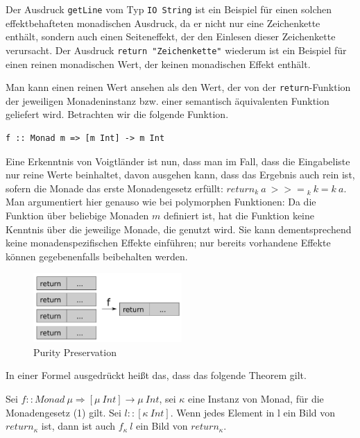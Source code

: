 Der Ausdruck \texttt{getLine} vom Typ \texttt{IO String} ist ein Beispiel für einen solchen effektbehafteten monadischen Ausdruck, da
er nicht nur eine Zeichenkette enthält, sondern auch einen Seiteneffekt, der den Einlesen dieser Zeichenkette verursacht.
Der Ausdruck \texttt{return\ "Zeichenkette"} wiederum ist ein Beispiel für einen reinen monadischen Wert, der keinen monadischen
Effekt enthält.

Man kann einen reinen Wert ansehen als den Wert, der von der \texttt{return}-Funktion der jeweiligen Monadeninstanz
bzw. einer semantisch äquivalenten Funktion geliefert wird. Betrachten wir die folgende Funktion.

\begin{verbatim}
f :: Monad m => [m Int] -> m Int
\end{verbatim}

Eine Erkenntnis von Voigtländer ist nun, dass man im Fall, dass die Eingabeliste nur reine Werte beinhaltet, davon ausgehen
kann, dass das Ergebnis auch rein ist, sofern die Monade das erste Monadengesetz erfüllt: $return_k\ a\ {>>=}_k\ k = k\ a$. Man argumentiert hier genauso wie bei polymorphen Funktionen: Da die Funktion über
beliebige Monaden $m$ definiert ist, hat die Funktion keine Kenntnis über die jeweilige Monade, die genutzt wird.
Sie kann dementsprechend keine monadenspezifischen Effekte einführen; nur bereits vorhandene
Effekte können gegebenenfalls beibehalten werden.

\begin{figure}[ht]
\centering
\includegraphics[height=100px]{purity-preservation}
\caption{Purity Preservation}
\label{fig:purity-preservation}
\end{figure}

In einer Formel ausgedrückt heißt das, dass das folgende Theorem gilt.

\begin{mytheorem}
Sei $f :: Monad\ \mu \Rightarrow [\mu\ Int] \rightarrow \mu\ Int$, sei $\kappa$ eine Instanz von Monad, für die Monadengesetz (1) gilt.
Sei $l :: [\kappa\ Int]$. Wenn jedes Element in l ein Bild von $return_{\kappa}$ ist, dann ist auch $f_{\kappa}\ l$ ein Bild von $return_{\kappa}$.
\end{mytheorem}

